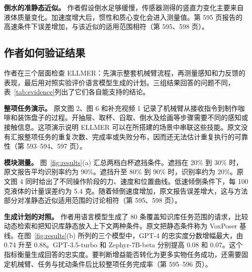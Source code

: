 \documentclass[UTF8,11pt,a4paper,twoside,fontset=none,heading=false]{ctexart}
\begin{document}
\textbf{倒水的准静态近似。} 作者假设倒水足够缓慢，传感器测得的竖直力变化主要来自液体质量变化。加速度增大后，惯性和质心变化会进入测量值。第 595 页报告的高速条件下误差增加，与该近似的适用范围相符（第 595、598 页）。

\clearpage
\subsection{作者如何验证结果}
\label{sec:evaluation}

作者在三个层面检查 ELLMER：先演示整套机械臂流程，再测量感知和力反馈的表现，最后用对照实验评价语言模型生成的计划。三组结果回答的问题不同，表~\ref{tab:evidence}列出了它们各自能支持的结论。

\textbf{整项任务演示。} 原文图 2、图 6 和补充视频 1 记录了机械臂从接收指令到制作咖啡和装饰盘子的过程。开抽屉、取杯、舀取、倒水及绘画等步骤需要不同的感知或接触信息。这项演示说明 ELLMER 可以在所搭建的场景中串联这些技能。原文没有汇报整项任务的重复次数、完成率或失败分布，因而还无法估计重复执行的可靠性（第 593--594、597 页）。

\textbf{模块测量。} 图~\ref{fig:results}(a) 汇总两档白杯遮挡条件。遮挡在 20\% 到 30\% 时，原文报告平均识别率约为 90\%。遮挡升至 80\% 到 90\% 时，识别率约为 20\%。原文图 4 同时给出了不同操作阶段的力、速度和位置曲线。低速倾倒条件下，每 100 克液体的计量误差约为 5.4 克。随着倾倒速度增加，原文报告误差增大，这与方法部分对准静态近似适用范围的讨论相符（第 595、598 页）。

\textbf{生成计划的对照。} 作者用语言模型生成了 80 条覆盖知识库任务范围的请求，比较动态检索和把知识库静态放入上下文两种条件。原文把静态条件称为 VoxPoser 基线。在图~\ref{fig:results}(b) 所列的三个模型中，GPT-4 的忠实度分数增幅最大，由 0.74 升至 0.88。GPT-3.5-turbo 和 Zephyr-7B-beta 分别提高 0.08 和 0.07。这个指标衡量生成回答的忠实度。要判断增益能否转化为更多实物任务成功，还需要固定机械臂、任务与扰动条件后比较整项任务完成率（第 595--596 页）。
\end{document}
